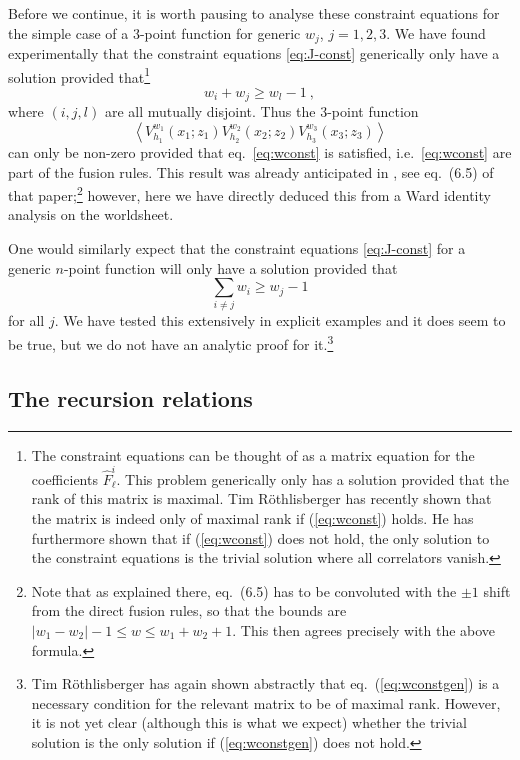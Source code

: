 \documentclass[12pt,a4paper]{article}
\newcommand{\be}{\begin{equation}}
\newcommand{\ee}{\end{equation}}
\begin{document}
Before we continue, it is worth pausing to analyse these constraint equations for the simple case of a $3$-point function for generic $w_j$, $j=1,2,3$. We have found experimentally that the constraint equations \eqref{eq:J-const} generically only have a solution provided that\footnote{The constraint equations can be thought of as a matrix equation for the coefficients $\hat{F}^i_\ell$. This problem generically only has a solution provided that the rank of this matrix is maximal. Tim R\"othlisberger has recently shown that the matrix is indeed only of maximal rank if (\ref{eq:wconst}) holds. He has furthermore shown that if (\ref{eq:wconst}) does not hold, the only solution to the constraint equations is the trivial solution where all correlators vanish.}
\be \label{eq:wconst}
w_i+w_j\ge w_l-1 \ ,
\ee
where $(i,j,l)$ are all mutually disjoint. Thus the 
$3$-point function 
\be 
\left \langle V_{h_1}^{w_1}(x_1;z_1)V_{h_2}^{w_2}(x_2;z_2)V_{h_3}^{w_3} (x_3;z_3)\right \rangle
\ee
can only be non-zero provided that eq.~\eqref{eq:wconst} is satisfied, i.e.\ \eqref{eq:wconst} are part of the fusion rules. This result was already anticipated in \cite{Eberhardt:2018ouy}, see eq.~(6.5) of that paper;\footnote{Note that as explained there, eq.~(6.5) has to be convoluted with the $\pm 1$ shift from the direct fusion rules, so that the bounds are $|w_1 - w_2| - 1 \leq w  \leq w_1 + w_2 + 1$. This then agrees precisely with the above formula.} however, here we have directly deduced this from a Ward identity analysis on the worldsheet. 

One would similarly expect that the constraint equations \eqref{eq:J-const} for a generic $n$-point function will only have a solution provided that 
\be\label{eq:wconstgen}
\sum_{i\neq j} w_i \geq w_j-1
\ee
for all $j$. We have tested this extensively in explicit examples and it does seem to be true, but we do not have an analytic proof for it.\footnote{Tim R\"othlisberger has again shown abstractly that eq.~(\ref{eq:wconstgen}) is a necessary condition for the relevant matrix to be of maximal rank. However, it is not yet clear (although this is what we expect) whether the trivial solution is the only solution if (\ref{eq:wconstgen}) does not hold.}


\subsection{The recursion relations}\label{sec:recursion}
\end{document}
